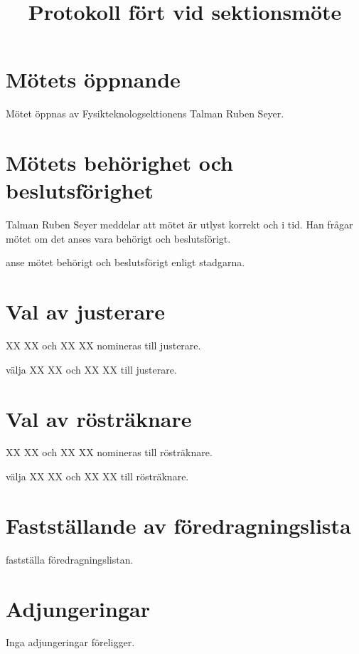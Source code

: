 \documentclass[hidelinks]{sektionsmote}
\title{Protokoll fört vid sektionsmöte}
\begin{document}
\maketitle

\section{Mötets öppnande}
Mötet öppnas \tid av Fysikteknologsektionens Talman Ruben Seyer.


\section{Mötets behörighet och beslutsförighet}
Talman Ruben Seyer meddelar att mötet är utlyst korrekt och i tid.
Han frågar mötet om det anses vara behörigt och beslutsförigt.
\begin{beslut}
    \item anse mötet behörigt och beslutsförigt enligt stadgarna.
\end{beslut}


\section{Val av justerare}
XX XX och XX XX nomineras till justerare.
\begin{beslut}
  \item välja XX XX och XX XX till justerare.
\end{beslut}


\section{Val av rösträknare}
XX XX och XX XX nomineras till rösträknare.
\begin{beslut}
  \item välja XX XX och XX XX till rösträknare.
\end{beslut}


\section{Fastställande av föredragningslista}
\begin{beslut}
  \item fastställa föredragningslistan.
\end{beslut}


\section{Adjungeringar}
Inga adjungeringar föreligger.
\end{document}
